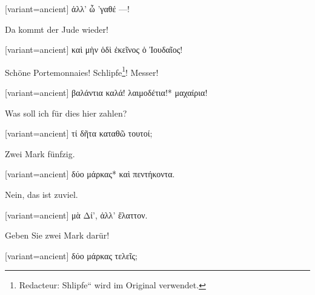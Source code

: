 \switchcolumn

\begin{greek}[variant=ancient]%
ἀλλ' ὦ 'γαθέ —!

\end{greek}%
Da kommt der Jude wieder!

\switchcolumn

\begin{greek}[variant=ancient]%
καὶ μὴν ὁδὶ ἐκεῖνος ὁ Ἰουδαῖος!

\end{greek}%
\switchcolumn*

Schöne Portemonnaies! Schlipfe\footnote{Redacteur: \quotedblbase Shlipfe`` wird im Original verwendet.}!
Messer!

\switchcolumn

\begin{greek}[variant=ancient]%
βαλάντια καλά! λαιμοδέτια!{*} μαχαίρια!

\end{greek}%
\switchcolumn*

Was soll ich für dies hier zahlen? 

\switchcolumn

\begin{greek}[variant=ancient]%
τί δῆτα καταθῶ τουτοί;

\end{greek}%
\switchcolumn*

Zwei Mark fünfzig. 

\switchcolumn

\begin{greek}[variant=ancient]%
δύο μάρκας{*} καὶ πεντήκοντα.

\end{greek}%
\switchcolumn*

Nein, das ist zuviel. 

\switchcolumn

\begin{greek}[variant=ancient]%
μὰ Δί', ἀλλ' ἔλαττον.

\end{greek}%
\switchcolumn*

Geben Sie zwei Mark darür! 

\switchcolumn

\begin{greek}[variant=ancient]%
δύο μάρκας τελεῖς;

\end{greek}%
\switchcolumn*

